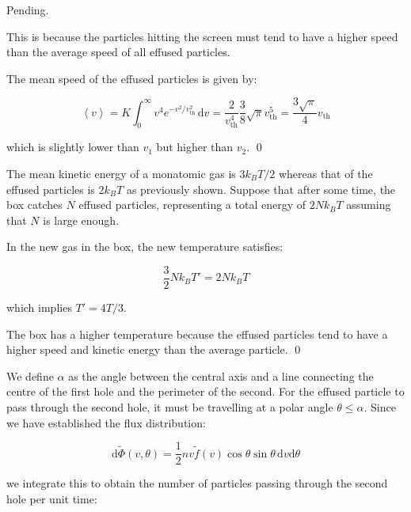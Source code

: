 \documentclass[12pt]{article}
\begin{document}
\begin{correction}
    Pending.
\end{correction}

This is because the particles hitting the screen must tend to have a higher speed than the average speed of all effused particles.

The mean speed of the effused particles is given by:

\begin{equation}
    \left\langle v \right\rangle = K \int_{0}^{\infty} v^{4} e^{-v^{2}/v_{\text{th}}^{2}} \, \mathrm{d}v = \frac{2}{v_{\text{th}}^{4}} \frac{3}{8} \sqrt{\pi} v_{\text{th}}^{5} = \frac{3\sqrt{\pi}}{4} v_{\text{th}}
\end{equation}

which is slightly lower than $v_{1}$ but higher than $v_{2}$.
\qed


The mean kinetic energy of a monatomic gas is $3k_{B}T/2$ whereas that of the effused particles is $2k_{B}T$ as previously shown. Suppose that after some time, the box catches $N$ effused particles, representing a total energy of $2Nk_{B}T$ assuming that $N$ is large enough.

In the new gas in the box, the new temperature satisfies:

\begin{equation}
    \frac{3}{2} Nk_{B}T' = 2Nk_{B}T
\end{equation}

which implies $T' = 4T/3$.

The box has a higher temperature because the effused particles tend to have a higher speed and kinetic energy than the average particle.
\qed



We define $\alpha$ as the angle between the central axis and a line connecting the centre of the first hole and the perimeter of the second. For the effused particle to pass through the second hole, it must be travelling at a polar angle $\theta \le \alpha$. Since we have established the flux distribution:

\begin{equation}
    \mathrm{d}\tilde{\Phi}(v, \theta) = \frac{1}{2} nv \tilde{f}(v) \cos{\theta} \sin{\theta} \, \mathrm{d}v \mathrm{d}\theta
\end{equation}

we integrate this to obtain the number of particles passing through the second hole per unit time:
\end{document}
